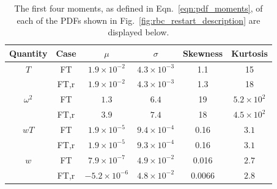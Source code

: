\documentclass[aps, pre, onecolumn, nofootinbib, notitlepage, groupedaddress, amsfonts, amssymb, amsmath, longbibliography, superscriptaddress]{revtex4-1}
\begin{document}
\begin{table}[t!]
\caption{ 
	The first four moments, as defined in Eqn.~\ref{eqn:pdf_moments}, of each of the PDFs shown in Fig.~\ref{fig:rbc_restart_description} are displayed below.
}
\setlength{\tabcolsep}{12pt}
\label{table:pdf_values}
\begin{center}
\begin{tabularx}{\textwidth}{c c c c c c}
\hline																	
Quantity &	Case	&	$\mu$	&	$\sigma$	&	Skewness	&	Kurtosis \\
\hline
$T$				&	FT		&		$1.9 \times 10^{-2}$	&	$4.3 \times 10^{-3}$	&	1.1		&	15 \\
				&	FT,r	&		$1.9 \times 10^{-2}$	&	$4.3 \times 10^{-3}$	&	1.3		&	18 \\
\hline
$\omega^2$		&	FT		&		$1.3$					&	$6.4$					&	19		&	$5.2 \times 10^2$ \\
				&	FT,r	&		$3.9$					&	$7.4$					&	18		&	$4.5 \times 10^2$ \\
\hline
$wT$			&	FT		&		$1.9 \times 10^{-5}$	&	$9.4 \times 10^{-4}$	&	0.16	&	$3.1$ \\
				&	FT,r	&		$1.9 \times 10^{-5}$	&	$9.3 \times 10^{-4}$	&	0.16	&	$3.1$ \\
\hline
$w$				&	FT		&		$7.9 \times 10^{-7}$	&	$4.9 \times 10^{-2}$	&	0.016	&	$2.7$ \\
				&	FT,r	&		$-5.2 \times 10^{-6}$	&	$4.8 \times 10^{-2}$	&	0.0066	&	$2.8$ \\
\hline																	
\end{tabularx}
\end{center}
\end{table}
\end{document}
